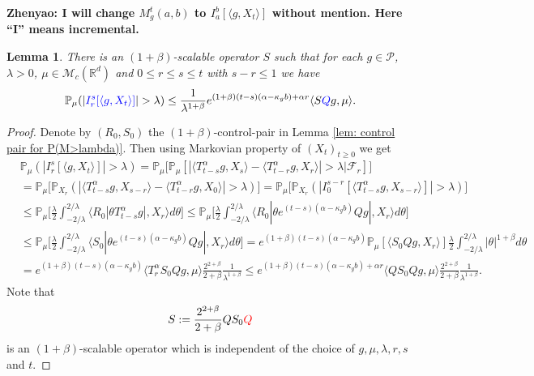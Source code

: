 \documentclass[12pt,oneside,english]{amsart}
\theoremstyle{plain}
\newtheorem{lem}[thm]{Lemma}
\theoremstyle{definition}
\numberwithin{equation}{section}
\newcommand{\added}[1]{{\color{blue}#1}}\newcommand{\deleted}[1]{{\color{red}#1}}
\begin{document}
{\bf Zhenyao: I will change $M_g^t(a,b)$ to $I_a^b[\langle g,X_t\rangle]$ without mention. Here ``I'' means incremental.}

\begin{lem}
    There is an $(1+\beta)$-scalable operator $S$ such that for each $g\in \mathcal P$, $\lambda >0$, $\mu\in \mathcal M_c(\mathbb R^d)$ and $0\leq r\leq s\leq t$ with $s-r \leq 1$ we have
\[
    \mathbb P_{\mu}(|\added{I_r^s[\langle g, X_t\rangle]}|>\lambda)
    \leq \frac{ 1}{\lambda^{1+\beta}} e^{(1+\beta)(t-s)(\alpha- \kappa_gb)+ \alpha r} \langle S\added{Q}g,\mu\rangle.
\]
\end{lem}

\begin{proof}
    Denote by $(R_0,S_0)$ the $(1+\beta)$-control-pair in Lemma \ref{lem: control pair for P(M>lambda)}.
    Then using Markovian property of $(X_t)_{t\geq 0}$ we get
\added{
\begin{align}
    &\mathbb P_{\mu}(|I_r^s[\langle g, X_t\rangle]|>\lambda)
    = \mathbb P_\mu \big[\mathbb P_\mu[|\langle T_{t-s}^\alpha g, X_{s}\rangle - \langle T_{t-r}^\alpha g, X_{r}\rangle|> \lambda\big| \mathscr F_r]\big]
    \\&= \mathbb P_\mu \big[\mathbb P_{X_r}(|\langle T_{t-s}^\alpha g, X_{s-r}\rangle - \langle T_{t-r}^\alpha g, X_{0}\rangle|> \lambda)\big]
    = \mathbb P_\mu \big[\mathbb P_{X_r}(|I_0^{s-r}[\langle T_{t-s}^\alpha g, X_{s-r}\rangle] |> \lambda)\big]
    \\&\leq \mathbb P_\mu \Big[ \frac{\lambda}{2}\int_{-2/\lambda}^{2/\lambda}\langle R_0|\theta T^\alpha_{t-s}g|,X_r\rangle d\theta \Big]
    \leq \mathbb P_\mu \Big[ \frac{\lambda}{2}\int_{-2/\lambda}^{2/\lambda}\langle R_0|\theta e^{(t-s)(\alpha- \kappa_gb)}Qg|,X_r\rangle d\theta \Big]
	\\&\leq \mathbb P_\mu \Big[ \frac{\lambda}{2}\int_{-2/\lambda}^{2/\lambda}\langle S_0|\theta e^{(t-s)(\alpha- \kappa_gb)}Qg|,X_r\rangle d\theta \Big]
    = e^{(1+\beta)(t-s)(\alpha- \kappa_gb)} \mathbb P_\mu [ \langle S_0Qg,X_r\rangle ] \frac{\lambda}{2}\int_{-2/\lambda}^{2/\lambda}|\theta|^{1+\beta}d\theta
    \\& = e^{(1+\beta)(t-s)(\alpha- \kappa_gb)} \langle T_r^\alpha S_0Qg,\mu\rangle  \frac{2^{2+\beta}}{2+\beta}\frac{1}{\lambda^{1+\beta}}
    \leq e^{(1+\beta)(t-s)(\alpha- \kappa_gb)+ \alpha r} \langle QS_0Qg,\mu\rangle  \frac{2^{2+\beta}}{2+\beta}\frac{1}{\lambda^{1+\beta}}.
\end{align}
}
    Note that
\[
    S := \frac{2^{2+\beta}}{2+\beta}QS_0\deleted{Q}
\]
    is an $(1+\beta)$-scalable operator which is independent of the choice of $g,\mu, \lambda, r, s$ and $t$.
\end{proof}
\end{document}
